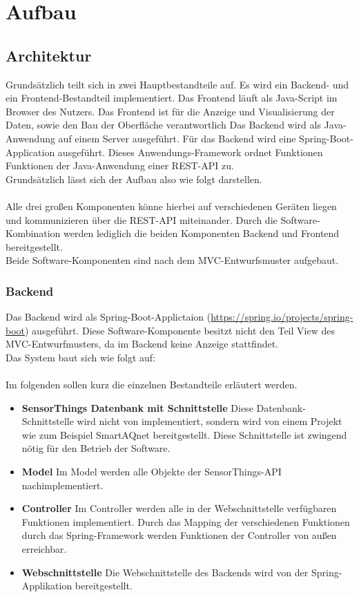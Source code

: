 \section{Aufbau}
\subsection{Architektur}
Grundsätzlich teilt sich \softwarename in zwei Hauptbestandteile auf.
Es wird ein Backend- und ein Frontend-Bestandteil implementiert.
Das Frontend läuft als Java-Script im Browser des Nutzers.
Das Frontend ist für die Anzeige und Visualisierung der Daten, sowie den Bau der Oberfläche verantwortlich
Das Backend wird als Java-Anwendung auf einem Server ausgeführt.
Für das Backend wird eine Spring-Boot-Application ausgeführt.
Dieses Anwendungs-Framework ordnet Funktionen Funktionen der Java-Anwendung einer REST-\gls{API} zu.
\\
Grundsätzlich lässt sich der Aufbau also wie folgt darstellen.
\\

\\
Alle drei großen Komponenten könne hierbei auf verschiedenen Geräten liegen und kommunizieren über die REST-API miteinander.
Durch die Software-Kombination \softwarename werden lediglich die beiden Komponenten \softwarename Backend und \softwarename Frontend bereitgestellt.
\\
Beide Software-Komponenten sind nach dem \gls{MVC}-Entwurfsmuster aufgebaut. 
\subsubsection{Backend}
Das Backend wird als Spring-Boot-Applictaion (\url{https://spring.io/projects/spring-boot}) ausgeführt.
Diese Software-Komponente besitzt nicht den Teil View des MVC-Entwurfmusters, da im Backend keine Anzeige stattfindet.
\\
Das System baut sich wie folgt auf:
\\

\\
Im folgenden sollen kurz die einzelnen Bestandteile erläutert werden.
\begin{itemize}
    \item \textbf{SensorThings Datenbank mit Schnittstelle} Diese Datenbank-Schnittstelle wird nicht von \softwarename implementiert, sondern wird von einem Projekt wie zum Beispiel SmartAQnet bereitgestellt.
    Diese Schnittstelle ist zwingend nötig für den Betrieb der Software.
    \item \textbf{Model} Im Model werden alle Objekte der SensorThings-API nachimplementiert.
    \item \textbf{Controller} Im Controller werden alle in der Webschnittstelle verfügbaren Funktionen implementiert.
    Durch das Mapping der verschiedenen Funktionen durch das Spring-Framework werden Funktionen der Controller von außen erreichbar.
    \item \textbf{Webschnittstelle} Die Webschnittstelle des Backends wird von der Spring-Applikation bereitgestellt.
\end{itemize}
\clearpage
